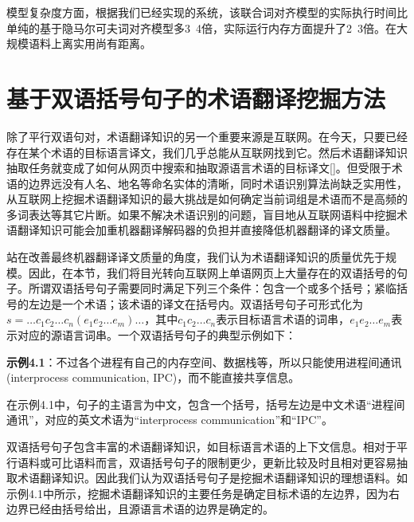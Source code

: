 模型复杂度方面，根据我们已经实现的系统，该联合词对齐模型的实际执行时间比单纯的基于隐马尔可夫词对齐模型多3~4倍，实际运行内存方面提升了2~3倍。在大规模语料上离实用尚有距离。

\section{基于双语括号句子的术语翻译挖掘方法}

除了平行双语句对，术语翻译知识的另一个重要来源是互联网。在今天，只要已经存在某个术语的目标语言译文，我们几乎总能从互联网找到它。然后术语翻译知识抽取任务就变成了如何从网页中搜索和抽取源语言术语的目标译文[\cite{Ren:2010}]。但受限于术语的边界远没有人名、地名等命名实体的清晰，同时术语识别算法尚缺乏实用性，从互联网上挖掘术语翻译知识的最大挑战是如何确定当前词组是术语而不是高频的多词表达等其它片断。如果不解决术语识别的问题，盲目地从互联网语料中挖掘术语翻译知识可能会加重机器翻译解码器的负担并直接降低机器翻译的译文质量。

站在改善最终机器翻译译文质量的角度，我们认为术语翻译知识的质量优先于规模。因此，在本节，我们将目光转向互联网上单语网页上大量存在的双语括号的句子。所谓双语括号句子需要同时满足下列三个条件：包含一个或多个括号；紧临括号的左边是一个术语；该术语的译文在括号内。双语括号句子可形式化为$s=\ldots c_1c_2\ldots c_n(e_1e_2\ldots e_m) \ldots$，其中$c_1c_2\ldots c_n$表示目标语言术语的词串，$e_1e_2\ldots e_m$表示对应的源语言词串。一个双语括号句子的典型示例如下：

\begin{center}
	\begin{boxedminipage}[h]{0.9\linewidth}
		\small
		\textbf{示例4.1}：不过各个进程有自己的内存空间、数据栈等，所以只能使用进程间通讯 (interprocess communication, IPC)，而不能直接共享信息。
	\end{boxedminipage}
\end{center}

在示例4.1中，句子的主语言为中文，包含一个括号，括号左边是中文术语“进程间通讯”，对应的英文术语为“interprocess communication”和“IPC”。

双语括号句子包含丰富的术语翻译知识，如目标语言术语的上下文信息。相对于平行语料或可比语料而言，双语括号句子的限制更少，更新比较及时且相对更容易抽取术语翻译知识。因此我们认为双语括号句子是挖掘术语翻译知识的理想语料。如示例4.1中所示，挖掘术语翻译知识的主要任务是确定目标术语的左边界，因为右边界已经由括号给出，且源语言术语的边界是确定的。


